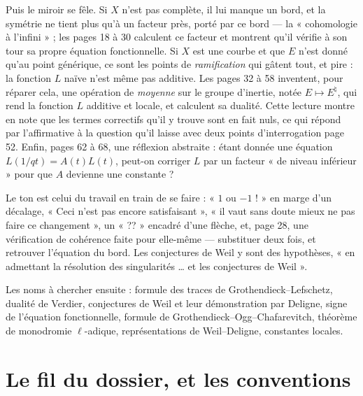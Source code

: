 \documentclass[11pt,a4paper]{article}
\begin{document}
\begin{resume}
Puis le miroir se fêle. Si $X$ n'est pas complète, il lui manque un bord, et
la symétrie ne tient plus qu'à un facteur près, porté par ce bord --- la
« cohomologie à l'infini » ; les pages 18 à 30 calculent ce facteur et
montrent qu'il vérifie à son tour sa propre équation fonctionnelle. Si $X$ est
une courbe et que $E$ n'est donné qu'au point générique, ce sont les points de
\emph{ramification} qui gâtent tout, et pire : la fonction $L$ naïve n'est même
pas additive. Les pages 32 à 58 inventent, pour réparer cela, une opération de
\emph{moyenne} sur le groupe d'inertie, notée $E \mapsto E^{\natural}$, qui
rend la fonction $L$ additive et locale, et calculent sa dualité. Cette lecture
montre en note que les termes correctifs qu'il y trouve sont en fait nuls, ce
qui répond par l'affirmative à la question qu'il laisse avec deux points
d'interrogation page 52. Enfin, pages 62 à 68, une réflexion abstraite :
étant donnée une équation $L(1/qt) = A(t)L(t)$, peut-on corriger $L$ par un
facteur « de niveau inférieur » pour que $A$ devienne une constante ?

Le ton est celui du travail en train de se faire : « $1$ ou $-1$ ! » en marge
d'un décalage, « Ceci n'est pas encore satisfaisant », « il vaut sans doute
mieux ne pas faire ce changement », un « ?? » encadré d'une flèche, et, page 28,
une vérification de cohérence faite pour elle-même --- substituer deux fois, et
retrouver l'équation du bord. Les conjectures de Weil y sont des hypothèses,
« en admettant la résolution des singularités … et les conjectures de Weil ».

Les noms à chercher ensuite : formule des traces de Grothendieck--Lefschetz,
dualité de Verdier, conjectures de Weil et leur démonstration par Deligne,
signe de l'équation fonctionnelle, formule de Grothendieck--Ogg--Chafarevitch,
théorème de monodromie $\ell$-adique, représentations de Weil--Deligne,
constantes locales.

\end{resume}

\section*{Le fil du dossier, et les conventions}
\end{document}
